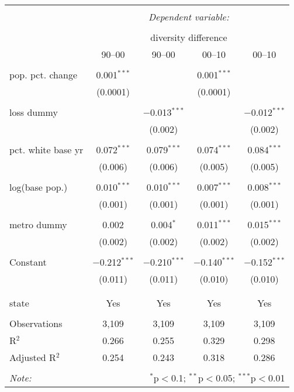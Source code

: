 \documentclass{standalone}
\begin{document}
\begin{tabular}{@{\extracolsep{5pt}}lcccc} 
\\[-1.8ex]\hline 
\hline \\[-1.8ex] 
 & \multicolumn{4}{c}{\textit{Dependent variable:}} \\ 
\cline{2-5} 
\\[-1.8ex] & \multicolumn{4}{c}{diversity difference} \\ 
 & 90--00 & 90--00 & 00--10 & 00--10 \\ 
\hline \\[-1.8ex] 
 pop. pct. change & 0.001$^{***}$ &  & 0.001$^{***}$ &  \\ 
  & (0.0001) &  & (0.0001) &  \\ 
  & & & & \\ 
 loss dummy &  & $-$0.013$^{***}$ &  & $-$0.012$^{***}$ \\ 
  &  & (0.002) &  & (0.002) \\ 
  & & & & \\ 
 pct. white base yr & 0.072$^{***}$ & 0.079$^{***}$ & 0.074$^{***}$ & 0.084$^{***}$ \\ 
  & (0.006) & (0.006) & (0.005) & (0.005) \\ 
  & & & & \\ 
 log(base pop.) & 0.010$^{***}$ & 0.010$^{***}$ & 0.007$^{***}$ & 0.008$^{***}$ \\ 
  & (0.001) & (0.001) & (0.001) & (0.001) \\ 
  & & & & \\ 
 metro dummy & 0.002 & 0.004$^{*}$ & 0.011$^{***}$ & 0.015$^{***}$ \\ 
  & (0.002) & (0.002) & (0.002) & (0.002) \\ 
  & & & & \\ 
 Constant & $-$0.212$^{***}$ & $-$0.210$^{***}$ & $-$0.140$^{***}$ & $-$0.152$^{***}$ \\ 
  & (0.011) & (0.011) & (0.010) & (0.010) \\ 
  & & & & \\ 
\hline \\[-1.8ex] 
state & Yes & Yes & Yes & Yes \\ 
\hline \\[-1.8ex] 
Observations & 3,109 & 3,109 & 3,109 & 3,109 \\ 
R$^{2}$ & 0.266 & 0.255 & 0.329 & 0.298 \\ 
Adjusted R$^{2}$ & 0.254 & 0.243 & 0.318 & 0.286 \\ 
\hline 
\hline \\[-1.8ex] 
\textit{Note:}  & \multicolumn{4}{r}{$^{*}$p$<$0.1; $^{**}$p$<$0.05; $^{***}$p$<$0.01} \\ 
\end{tabular} 
\end{document}
